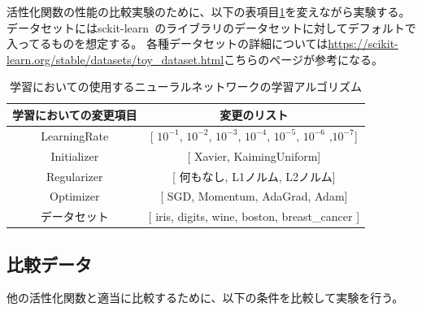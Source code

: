 活性化関数の性能の比較実験のために、以下の表項目\ref{list:learning_algorithm_change}を変えながら実験する。
データセットにはsckit-learn~\cite{scikit-learn}のライブラリのデータセットに対してデフォルトで入ってるものを想定する。
各種データセットの詳細については\url{https://scikit-learn.org/stable/datasets/toy_dataset.html}こちらのページが参考になる。



\begin{table}[htbp]
    \begin{center}
        \caption{学習においての使用するニューラルネットワークの学習アルゴリズム}
        \label{list:learning_algorithm_change}
        \vspace{2mm} 
        \begin{tabular}{ |c|c| }
        \hline
        学習においての変更項目 & 変更のリスト\\
        \hline
        LearningRate           & [  $10^{-1}$,  $10^{-2}$,  $10^{-3}$,  $10^{-4}$, $10^{-5}$, $10^{-6}$ ,$10^{-7}$]    \\
        \hline
        Initializer         & [ Xavier, KaimingUniform]   \\
        \hline
        Regularizer           & [ 何もなし, L1ノルム, L2ノルム]     \\
        \hline
        Optimizer         & [ SGD, Momentum, AdaGrad, Adam]   \\
        \hline
        データセット &  [ iris, digits, wine, boston, breast\_cancer ]    \\
        \hline
        \end{tabular}
    \end{center}
\end{table}



\subsection{比較データ}

他の活性化関数と適当に比較するために、以下の条件を比較して実験を行う。


